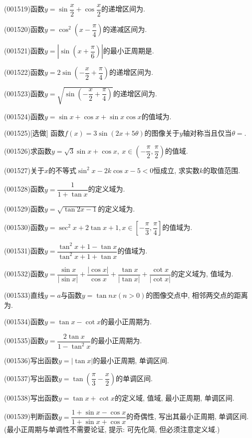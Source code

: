 \item (001519)函数$y=\sin \dfrac{x}{2}+\cos\dfrac{x}{2}$的递增区间为.
\item (001520)函数$y=\cos^2\left(x-\dfrac{\pi}{4}\right)$的递减区间为.
\item (001521)函数$y=\left|\sin\left(x+\dfrac{\pi}{6}\right)\right|$的最小正周期是.
\item (001522)函数$y=2\sin\left(-\dfrac{x}{2}+\dfrac{\pi}{4}\right)$的递增区间为.
\item (001523)函数$y=\sqrt{\sin\left(-\dfrac{x}{2}+\dfrac{\pi}{4}\right)}$的递增区间为.
\item (001524)函数$y=\sin x+\cos x+\sin x\cos x$的值域为.
\item (001525)[选做]
函数$f(x)=3\sin (2x+5\theta)$的图像关于$y$轴对称当且仅当$\theta=$.
\item (001526)求函数$y=\sqrt{3}\sin x+\cos x, \ x \in \left(-\dfrac{\pi}{2},\dfrac{\pi}{2}\right)$的值域.
\item (001527)关于$x$的不等式$\sin^2 x-2k\cos x-5<0$恒成立, 求实数$k$的取值范围.
\item (001528)函数$y=\dfrac{1}{1+\tan x}$的定义域为.
\item (001529)函数$y=\sqrt{\tan 2x-1}$的定义域为.
\item (001530)函数$y=\sec^2x+2\tan x+1,x\in[-\dfrac{\pi}{3},\dfrac{\pi}{4}]$的值域为.
\item (001531)函数$y=\dfrac{\tan^2 x+1-\tan x}{\tan^2 x+1+\tan x}$的值域为.
\item (001532)函数$y=\dfrac{\sin x}{|\sin x|}+\dfrac{|\cos x|}{\cos x}+\dfrac{\tan x}{|\tan x|}+\dfrac{\cot x}{|\cot x|}$的定义域为, 值域为.
\item (001533)直线$y=a$与函数$y=\tan nx(n>0)$的图像交点中, 相邻两交点的距离为.
\item (001534)函数$y=\tan x-\cot x$的最小正周期为.
\item (001535)函数$y=\dfrac{2\tan x}{1-\tan^2 x}$的最小正周期为.
\item (001536)写出函数$y=|\tan x|$的最小正周期, 单调区间.
\item (001537)写出函数$y=\tan(\dfrac{\pi}{3}-\dfrac{x}{2})$的单调区间.
\item (001538)写出函数$y=\tan x+\cot x$的定义域, 值域, 最小正周期, 单调区间.
\item (001539)判断函数$y=\dfrac{1+\sin x-\cos x}{1+\sin x+\cos x}$的奇偶性, 写出其最小正周期, 单调区间. (最小正周期与单调性不需要论证, 提示: 可先化简, 但必须注意定义域.)
